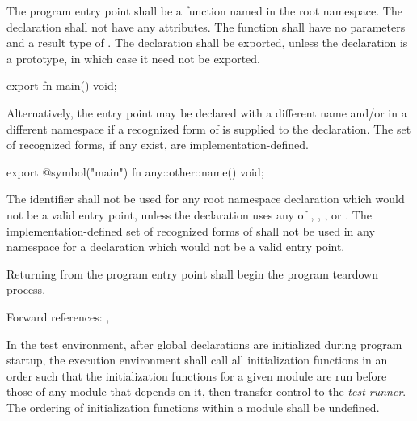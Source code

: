 \specsubsubitem
The program entry point shall be a function named  in the root
namespace. The declaration shall not have any attributes. The function shall
have no parameters and a result type of . The declaration shall
be exported, unless the declaration is a prototype, in which case it need not be
exported.


\begin{codesample}
export fn main() void;
\end{codesample}


\specsubsubitem
Alternatively, the entry point may be declared with a different name and/or in a
different namespace if a recognized form of  is supplied to
the declaration. The set of recognized forms, if any exist, are
implementation-defined.


\begin{codesample}
export @symbol("main") fn any::other::name() void;
\end{codesample}

\specsubsubitem
The identifier  shall not be used for any root namespace declaration
which would not be a valid entry point, unless the declaration uses any of
, , , or .
The implementation-defined set of recognized forms of  shall
not be used in any namespace for a declaration which would not be a valid entry
point.

\specsubsubitem
Returning from the program entry point shall begin the program teardown process.

Forward references: , 


\specsubsubitem
In the test environment, after global declarations are initialized during
program startup, the execution environment shall call all initialization
functions in an order such that the initialization functions for a given
module are run before those of any module that depends on it, then transfer
control to the \textit{test runner}. The ordering of initialization functions
within a module shall be undefined.

